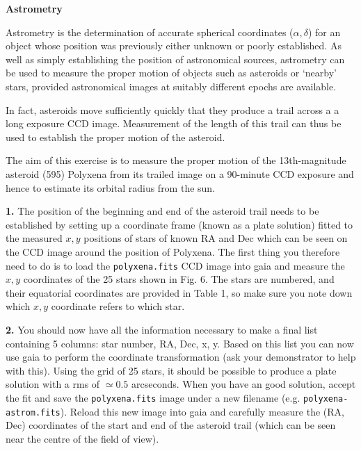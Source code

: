 \pagestyle{myheadings}
\renewcommand\baselinestretch{1.0}
\setcounter{page}{1}
\begin{center}
{\Huge \bf Astrometry}
\end{center}

Astrometry is the determination of accurate spherical coordinates
($\alpha, \delta$) for an object whose position was previously either 
unknown or poorly established. As well as simply establishing the
position of astronomical sources, astrometry can be used to measure the
proper motion of objects such as asteroids or `nearby' stars, provided
astronomical images at suitably different  epochs are available. 

In fact, 
asteroids move sufficiently quickly that they produce a trail across a
a long exposure CCD image. Measurement of the length of this trail can thus be used to establish 
the proper motion of the asteroid.

The aim of this exercise is to measure the proper motion of the
\setcounter{page}{1}13th-magnitude asteroid (595) Polyxena from its trailed 
image on a 90-minute CCD exposure and hence to estimate its orbital radius from the sun.

{\bf 1.} The position of the beginning and end of the asteroid trail needs to
be established by setting up a coordinate frame (known as a plate solution) fitted to the measured
$x,y$ positions of stars of known RA and Dec which can be seen on the
CCD image around the position of Polyxena. The first thing you
therefore need to do is to load the {\tt polyxena.fits} CCD image into {\sc gaia} and
measure the $x,y$ coordinates of the 25 stars shown in Fig. 6. The stars are numbered, and their 
equatorial coordinates are provided in Table 1, so make
sure you note down which $x,y$ coordinate refers to which star. 

{\bf 2.} You should now have all the information necessary to make a final list 
containing 5 columns: star number, RA, Dec, x, y. Based on this list you can now use {\sc gaia} 
to perform the coordinate transformation (ask your demonstrator to help with this).
Using the grid of 25 
stars, it should be possible to produce a plate solution with a rms of $\simeq 0.5$ arcseconds. When you 
have an good solution, accept the fit and save the {\tt polyxena.fits} image under a 
new filename (e.g. {\tt polyxena-astrom.fits}). Reload 
this new image into {\sc gaia} and carefully measure the (RA, Dec) coordinates of the start and end of the 
asteroid trail (which can be seen near the centre of the field of view).


